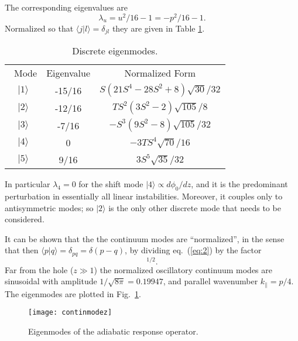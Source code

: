\documentclass[12pt]{article}
\def\ket#1{|#1\rangle}
\def\bra#1{\langle#1}
\begin{document}
The corresponding eigenvalues are
\begin{equation}
  \label{eq:3}
  \lambda_u= u^2/16-1=-p^2/16-1.
\end{equation}
Normalized so that
$\bra{j}\ket{l}=\delta_{jl}$ they are given in Table \ref{discrete}. 
\begin{table}[ht]
  \center
\begin{tabular}{ccc}\
  Mode & Eigenvalue & Normalized Form\\
  $\ket{1}$& -15/16&$S(21S^4 - 28S^2 + 8)\sqrt{30}/32$\\
  $\ket{2}$& -12/16&$TS^2(3S^2 - 2)\sqrt{105}/8$\\
  $\ket{3}$& -7/16 &$-S^3(9S^2 - 8)\sqrt{105}/32 $\\
  $\ket{4}$&  0 &$-3TS^4\sqrt{70}/16 $\\
  $\ket{5}$&  9/16 &$3S^5\sqrt{35}/32 $\\
\end{tabular}
\caption{Discrete eigenmodes.\label{discrete}}
\end{table}
\noindent
In particular $\lambda_4=0$ for the shift mode
$\ket{4}\propto d\phi_0/dz$, and it is the predominant
perturbation in essentially all linear instabilities. Moreover, it
couples only to antisymmetric modes; so $\ket{2}$ is the only other
discrete mode that needs to be considered.

It can
be shown that the the continuum modes are ``normalized'', in the sense
that then $\bra{p}\ket{q}=\delta_{pq}=\delta(p-q)$, by dividing eq.\
(\ref{eq:2}) by the factor
\begin{equation}
  [8\pi(p^2+1^2)(p^2+2^2)(p^2+3^2)(p^2+4^2)(p^2+5^2)]^{1/2}.
  \label{eq:4}
\end{equation}
Far
from the hole ($z\gg1$) the normalized oscillatory continuum modes are
sinusoidal with amplitude $1/\sqrt{8\pi}=0.19947$, and parallel wavenumber
$k_\parallel=p/4$. The eigenmodes are plotted in Fig.\
\ref{modeplots}.
\begin{figure}\center
  \texttt{[image: continmodez]}
\caption{Eigenmodes of the adiabatic response operator.\label{modeplots}}
\end{figure}
\end{document}

